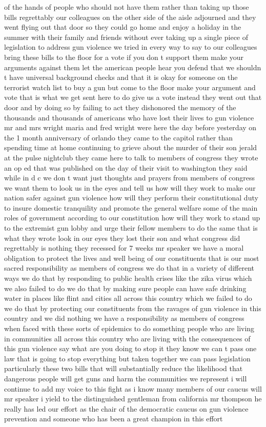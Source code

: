 \documentclass{article}
\begin{document}
of the hands of people who should not have them rather than taking up those bills regrettably our colleagues on the other side of the aisle adjourned and they went flying out that door so they could go home and enjoy a holiday in the summer with their family and friends without ever taking up a single piece of legislation to address gun violence we tried in every way to say to our colleagues bring these bills to the floor for a vote if you don t support them make your arguments against them let the american people hear you defend that we shouldn t have universal background checks and that it is okay for someone on the terrorist watch list to buy a gun but come to the floor make your argument and vote that is what we get sent here to do give us a vote instead they went out that door and by doing so by failing to act they dishonored the memory of the thousands and thousands of americans who have lost their lives to gun violence mr and mrs wright maria and fred wright were here the day before yesterday on the 1 month anniversary of orlando they came to the capitol rather than spending time at home continuing to grieve about the murder of their son jerald at the pulse nightclub they came here to talk to members of congress they wrote an op ed that was published on the day of their visit to washington they said while in d c we don t want just thoughts and prayers from members of congress we want them to look us in the eyes and tell us how will they work to make our nation safer against gun violence how will they perform their constitutional duty to insure domestic tranquility and promote the general welfare some of the main roles of government according to our constitution how will they work to stand up to the extremist gun lobby and urge their fellow members to do the same that is what they wrote look in our eyes they lost their son and what congress did regrettably is nothing they recessed for 7 weeks mr speaker we have a moral obligation to protect the lives and well being of our constituents that is our most sacred responsibility as members of congress we do that in a variety of different ways we do that by responding to public health crises like the zika virus which we also failed to do we do that by making sure people can have safe drinking water in places like flint and cities all across this country which we failed to do we do that by protecting our constituents from the ravages of gun violence in this country and we did nothing we have a responsibility as members of congress when faced with these sorts of epidemics to do something people who are living in communities all across this country who are living with the consequences of this gun violence say what are you doing to stop it they know we can t pass one law that is going to stop everything but taken together we can pass legislation particularly these two bills that will substantially reduce the likelihood that dangerous people will get guns and harm the communities we represent i will continue to add my voice to this fight as i know many members of our caucus will mr speaker i yield to the distinguished gentleman from california mr thompson he really has led our effort as the chair of the democratic caucus on gun violence prevention and someone who has been a great champion in this effort
\end{document}
